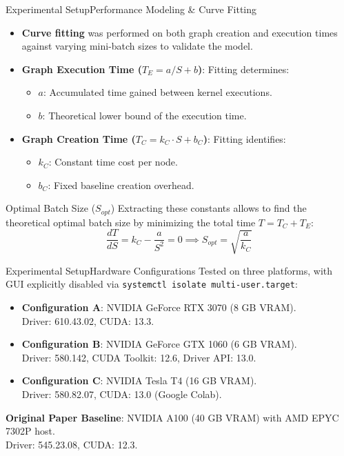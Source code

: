 \documentclass[10pt,aspectratio=43]{beamer}
\begin{document}
\begin{frame}{Experimental Setup}{Performance Modeling \& Curve Fitting}
    \begin{itemize}
        \item \textbf{Curve fitting} was performed on both graph creation and execution times against varying mini-batch sizes to validate the model.
        \item \textbf{Graph Execution Time ($T_E = a/S + b$)}: Fitting determines:
        \begin{itemize}
            \item $a$: Accumulated time gained between kernel executions.
            \item $b$: Theoretical lower bound of the execution time.
        \end{itemize}
        \item \textbf{Graph Creation Time ($T_C = k_C \cdot S + b_C$)}: Fitting identifies:
        \begin{itemize}
            \item $k_C$: Constant time cost per node.
            \item $b_C$: Fixed baseline creation overhead.
        \end{itemize}
    \end{itemize}
    
    \vspace{-0.1cm}
    \begin{block}{Optimal Batch Size ($S_{opt}$)}
        Extracting these constants allows to find the theoretical optimal batch size by minimizing the total time $T = T_C + T_E$:
        \begin{equation}
            \frac{dT}{dS} = k_C - \frac{a}{S^2} = 0 \implies S_{opt} = \sqrt{\frac{a}{k_C}}
        \end{equation}
    \end{block}
\end{frame}

\begin{frame}{Experimental Setup}{Hardware Configurations}
    Tested on three platforms, with GUI explicitly disabled via \texttt{systemctl isolate multi-user.target}:
    
    \begin{itemize}
        \item \textbf{Configuration A}: NVIDIA GeForce RTX 3070 (8 GB VRAM). \\Driver: 610.43.02, CUDA: 13.3.
        \item \textbf{Configuration B}: NVIDIA GeForce GTX 1060 (6 GB VRAM). \\Driver: 580.142, CUDA Toolkit: 12.6, Driver API: 13.0.
        \item \textbf{Configuration C}: NVIDIA Tesla T4 (16 GB VRAM). \\Driver: 580.82.07, CUDA: 13.0 (Google Colab).
    \end{itemize}
    
    \vspace{0.2cm}
    \textbf{Original Paper Baseline}: NVIDIA A100 (40 GB VRAM) with AMD EPYC 7302P host. \\Driver: 545.23.08, CUDA: 12.3.
\end{frame}
\end{document}
